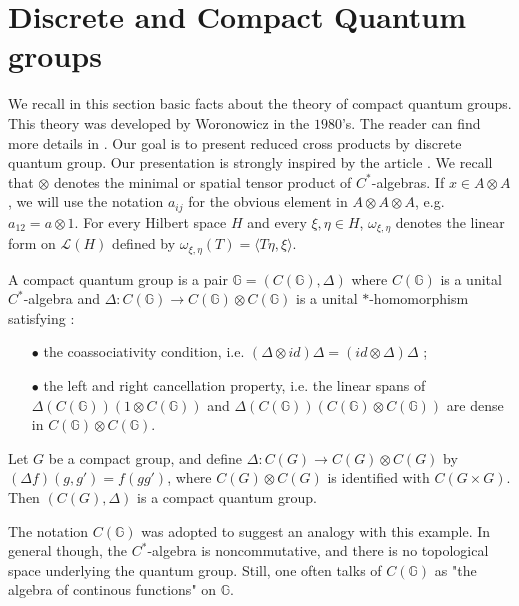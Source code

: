 \section{Discrete and Compact Quantum groups}

We recall in this section basic facts about the theory of compact quantum groups. This theory was developed by Woronowicz in the $1980$'s. The reader can find more details in \cite{Wo}. Our goal is to present reduced cross products by discrete quantum group. Our presentation is strongly inspired by the article \cite{VerVaes}. We recall that $\otimes$ denotes the minimal or spatial tensor product of $C^*$-algebras. If $x\in A\otimes A$, we will use the notation $a_{ij}$ for the obvious element in $A\otimes A\otimes A$, e.g. $a_{12} = a\otimes 1$. For every Hilbert space $H$ and every $\xi,\eta \in H$, $\omega_{\xi,\eta}$ denotes the linear form on $\mathcal L(H)$ defined by $\omega_{\xi,\eta}(T) = \langle T\eta,\xi\rangle$.

\begin{definition}
A compact quantum group is a pair $\mathbb G = (C(\mathbb G),\Delta)$ where $C(\mathbb G)$ is a unital $C^*$-algebra and $\Delta : C(\mathbb G) \rightarrow C(\mathbb G)\otimes C(\mathbb G)$ is a unital $*$-homomorphism satisfying :
\begin{itemize}
\item[$\bullet$] the coassociativity condition, i.e. $(\Delta \otimes id)\Delta=(id\otimes \Delta )\Delta$ ;
\item[$\bullet$] the left and right cancellation property, i.e. the linear spans of $\Delta(C(\mathbb G))(1\otimes C(\mathbb G))$ and $\Delta(C(\mathbb G))(C(\mathbb G)\otimes C(\mathbb G))$ are dense in $C(\mathbb G)\otimes C(\mathbb G)$.
\end{itemize} 
\end{definition}

\begin{Expl} Let $G$ be a compact group, and define $\Delta : C(G)\rightarrow C(G)\otimes C(G)$ by $(\Delta f)(g,g') = f(gg')$, where $C(G)\otimes C(G)$ is identified with $C(G\times G)$. Then $(C(G),\Delta ) $ is a compact quantum group.
\end{Expl}

The notation $C(\mathbb G)$ was adopted to suggest an analogy with this example. In general though, the $C^*$-algebra is noncommutative, and there is no topological space underlying the quantum group. Still, one often talks of $C(\mathbb G)$ as "the algebra of continous functions" on $\mathbb G$.

